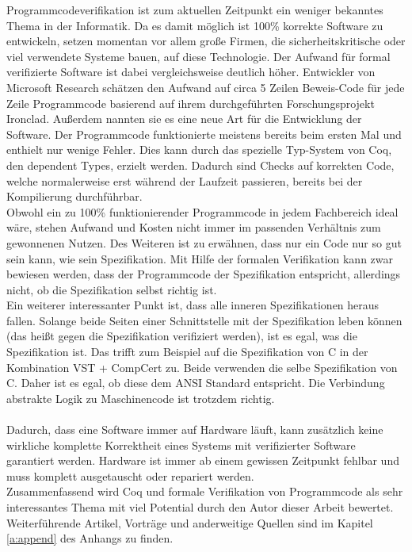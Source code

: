 Programmcodeverifikation ist zum aktuellen Zeitpunkt ein weniger bekanntes Thema in der Informatik. Da es damit möglich ist 100\% korrekte Software zu entwickeln, setzen momentan vor allem große Firmen, die sicherheitskritische oder viel verwendete Systeme bauen, auf diese Technologie. Der Aufwand für formal verifizierte Software ist dabei vergleichsweise deutlich höher. Entwickler von Microsoft Research schätzen den Aufwand auf circa 5 Zeilen Beweis-Code für jede Zeile Programmcode basierend auf ihrem durchgeführten Forschungsprojekt Ironclad. Außerdem nannten sie es eine neue Art für die Entwicklung der Software. Der Programmcode funktionierte meistens bereits beim ersten Mal und enthielt nur wenige Fehler.\cite{IRONCLAD01:FV} Dies kann durch das spezielle Typ-System von Coq, den dependent Types, erzielt werden. Dadurch sind Checks auf korrekten Code, welche normalerweise erst während der Laufzeit passieren, bereits bei der Kompilierung durchführbar.\\
Obwohl ein zu 100\% funktionierender Programmcode in jedem Fachbereich ideal wäre, stehen Aufwand und Kosten nicht immer im passenden Verhältnis zum gewonnenen Nutzen.
Des Weiteren ist zu erwähnen, dass nur ein Code nur so gut sein kann, wie sein Spezifikation. Mit Hilfe der formalen Verifikation kann zwar bewiesen werden, dass der Programmcode der Spezifikation entspricht, allerdings nicht, ob die Spezifikation selbst richtig ist.\\
Ein  weiterer interessanter Punkt ist, dass alle inneren Spezifikationen heraus fallen. Solange beide Seiten einer Schnittstelle mit der Spezifikation leben können (das heißt gegen die Spezifikation verifiziert werden), ist es egal, was die Spezifikation ist. Das trifft zum Beispiel auf die Spezifikation von C in der Kombination VST + CompCert zu. Beide verwenden die selbe Spezifikation von C. Daher ist es egal, ob diese dem ANSI Standard entspricht. Die Verbindung abstrakte Logik zu Maschinencode ist trotzdem richtig.\\
\\
Dadurch, dass eine Software immer auf Hardware läuft, kann zusätzlich keine wirkliche komplette Korrektheit eines Systems mit verifizierter Software garantiert werden. Hardware ist immer ab einem gewissen Zeitpunkt fehlbar und muss komplett ausgetauscht oder repariert werden.\\
Zusammenfassend wird Coq und formale Verifikation von Programmcode als sehr interessantes Thema mit viel Potential durch den Autor dieser Arbeit bewertet. Weiterführende Artikel, Vorträge und anderweitige Quellen sind im Kapitel \ref{a:append} des Anhangs zu finden. 



